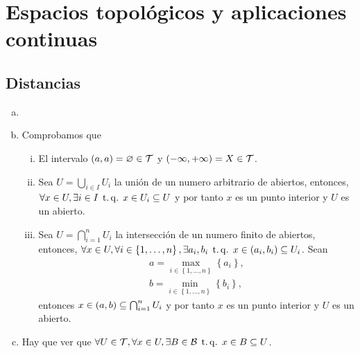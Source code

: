 \chapter{Espacios topológicos y aplicaciones continuas}
\section{Distancias}

\begin{eje}
    \begin{enumerate}[(a)]
        \item[]
        \item Comprobamos que
            \begin{enumerate}[i)]
                \item El intervalo $\left( a, a \right) = \varnothing \in \mathcal{T}$ y $\left( -\infty, +\infty \right) = X \in \mathcal{T}$.
                \item Sea $U = \bigcup_{i \in I} U_i$ la unión de un numero arbitrario de abiertos, entonces, $\forall x \in U, \exists i \in I \operatorname{\;t.q.\;} x \in U_i \subseteq U$ y por tanto $x$ es un punto interior y $U$ es un abierto.
                \item Sea $U = \bigcap_{i = 1}^n U_i$ la intersección de un numero finito de abiertos, entonces, $\forall x \in U, \forall i \in \left\{ 1, \dots, n \right\}, \exists a_i, b_i \operatorname{\;t.q.\;} x \in \left(a_i, b_i\right) \subseteq U_i$. Sean
                    \begin{gather*}
                        a = \max_{i \in \left\{ 1, \dots, n \right\}} \left\{a_i\right\}, \\
                        b = \min_{i \in \left\{ 1, \dots, n \right\}} \left\{b_i\right\},
                    \end{gather*}
                entonces $x \in \left( a, b \right) \subseteq \bigcap_{i = 1}^n U_i$ y por tanto $x$ es un punto interior y $U$ es un abierto.
            \end{enumerate}
        \item Hay que ver que $\forall U \in \mathcal{T}, \forall x \in U, \exists B \in \mathcal{B} \operatorname{\;t.q.\;} x \in B \subseteq U$.
    \end{enumerate}
\end{eje}

